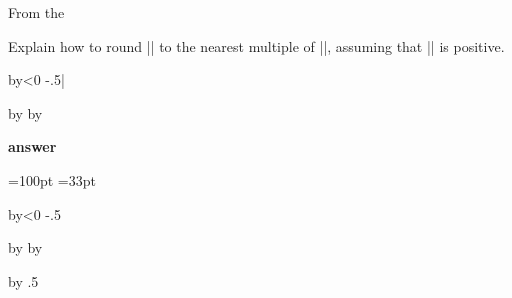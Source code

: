 %
%
%
%
%
%
%
%
%
%
%
%
%
%

From the \texbook

Explain how to round ||
to the nearest multiple of\/ ||, assuming that || is positive.

\begin{Code}
\advance{} by\ifnum{}<0 -\fi.5|\par
\divide{} by \multiply{} by
\end{Code}

\textbf{answer}


{
=100pt
=33pt

{


\advance{} by\ifnum{}<0 -\fi.5\par
\divide{} by \multiply{} by

\the{}
}

\the{}

\advance{} by .5

\the{}
}
\bigskip

